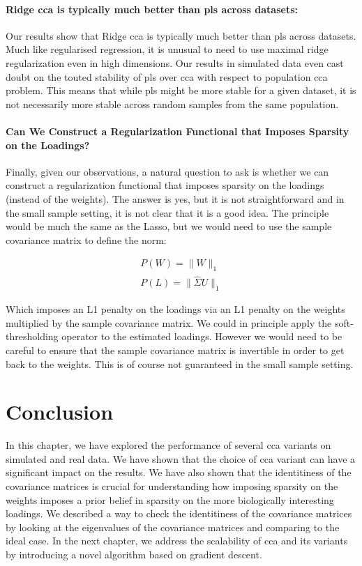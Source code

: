 \paragraph{Ridge \acrshort{cca} is typically much better than \acrshort{pls} across datasets:} Our results show that Ridge \acrshort{cca} is typically much better than \acrshort{pls} across datasets.
Much like regularised regression, it is unusual to need to use maximal ridge regularization even in high dimensions.
Our results in simulated data even cast doubt on the touted stability of \acrshort{pls} over \acrshort{cca} with respect to population \acrshort{cca} problem.
This means that while \acrshort{pls} might be more stable for a given dataset, it is not necessarily more stable across random samples from the same population.

\paragraph{Can We Construct a Regularization Functional that Imposes Sparsity on the Loadings?}
Finally, given our observations, a natural question to ask is whether we can construct a regularization functional that imposes sparsity on the \gls{loadings} (instead of the weights).
The answer is yes, but it is not straightforward and in the small sample setting, it is not clear that it is a good idea.
The principle would be much the same as the Lasso, but we would need to use the sample covariance matrix to define the norm:

\begin{align}
    P(W)=\|W\|_1 \\
    P(L)=\|\hat{\Sigma}U\|_1
\end{align}

Which imposes an L1 penalty on the \gls{loadings} via an L1 penalty on the \gls{weights} multiplied by the sample covariance matrix.
We could in principle apply the soft-thresholding operator to the estimated loadings.
However we would need to be careful to ensure that the sample covariance matrix is invertible in order to get back to the weights.
This is of course not guaranteed in the small sample setting.
\newpage
\section{Conclusion}

In this chapter, we have explored the performance of several \acrshort{cca} variants on simulated and real data.
We have shown that the choice of \acrshort{cca} variant can have a significant impact on the results.
We have also shown that the identitiness of the covariance matrices is crucial for understanding how imposing sparsity on the \gls{weights} imposes a prior belief in sparsity on the more biologically interesting loadings.
We described a way to check the identitiness of the covariance matrices by looking at the eigenvalues of the covariance matrices and comparing to the ideal case.
In the next chapter, we address the scalability of \acrshort{cca} and its variants by introducing a novel algorithm based on gradient descent.